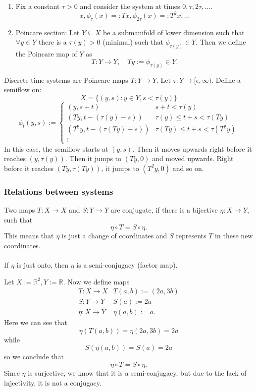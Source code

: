 \documentclass{article}
\newcommand*{\R}{\mathbb{R}}
\begin{document}
\begin{enumerate}
    \item Fix a constant $\tau>0$ and consider the system at times $0,\tau, 2\tau, \dots$.
    $$x, \phi_\tau(x)=:Tx, \phi_{2\tau}(x)=:T^2x,\dots$$

    \item Poincare section: Let $Y\subseteq X$ be a submanifold of lower dimension such that $\forall y \in Y$ there is a $\tau(y)>0$ (minimal) such that $\phi_{\tau(y)}\in Y$. Then we define the Poincare map of $Y$ as
    $$T:Y\to Y, \quad Ty:=\phi_{\tau(y)}\in Y.$$
\end{enumerate}

Discrete time systems are Poincare maps $T: Y\to Y$. Let $\tau:Y\to[\epsilon,\infty)$. Define a semiflow on:
$$X=\{(y,s):y\in Y,s < \tau(y)\}$$
$$\phi_t(y,s):=\begin{cases}
    (y,s+t) & s+t < \tau(y)\\
    (Ty,t-(\tau(y)-s)) & \tau(y) \leq t+s < \tau(Ty)\\
    (T^2y,t-(\tau(Ty)-s)) & \tau(Ty) \leq t+s < \tau(T^2y)\\
    \vdots
\end{cases}$$
In this case, the semiflow starts at $(y,s)$. Then it moves upwards right before it reaches $(y,\tau(y))$. Then it jumps to $(Ty,0)$ and moved upwards. Right before it reaches $(Ty, \tau(Ty))$, it jumps to $(T^2y,0)$ and so on.

\subsubsection{Relations between systems}

\begin{defin}
    Two maps $T:X\to X$ and $S:Y\to Y$ are conjugate, if there is a bijective $\eta:X\to Y$, such that
    $$\eta \circ T=S\circ \eta.$$
    This means that $\eta$ is just a change of coordinates and $S$ represents $T$ in these new coordinates.\\
    \\
    If $\eta$ is just onto, then $\eta$ is a semi-conjugacy (factor map).
\end{defin}



\begin{exam}
    Let $X := \R^2, Y := \R$. Now we define maps
    $$\begin{array}{ll}
        T:X \to X & T(a,b) := (2a,3b)\\
        S:Y \to Y & S(a) := 2a\\
        \eta:X\to Y & \eta(a,b) := a.
    \end{array}$$
    Here we can see that
    $$\eta(T(a,b)) = \eta(2a,3b) = 2a$$
    while
    $$S(\eta(a,b)) = S(a) = 2a$$
    so we conclude that
    $$\eta \circ T = S \circ \eta.$$
    Since $\eta$ is surjective, we know that it is a semi-conjugacy, but due to the lack of injectivity, it is not a conjugacy.
\end{exam}
\end{document}
